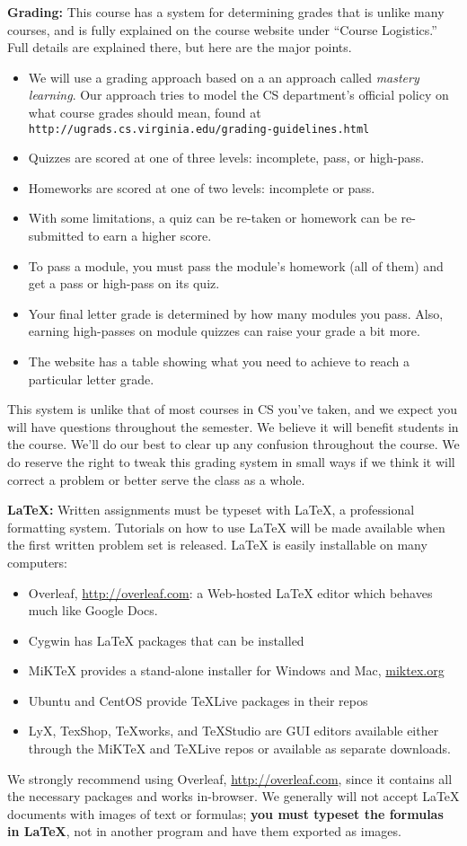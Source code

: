 \documentclass[12pt]{article}
\begin{document}
\textbf{Grading:} This course has a system for determining grades that is unlike many courses, and is fully explained on the course website under ``Course Logistics.'' Full details are explained there, but here are the major points.
\begin{itemize}
    \item We will use a grading approach based on a an approach called {\it mastery learning\/}. Our approach tries to model the CS department's official policy on what course grades should mean, found at {\tt http://ugrads.cs.virginia.edu/grading-guidelines.html}
    \item Quizzes are scored at one of three levels:  incomplete, pass, or high-pass.
    \item Homeworks are scored at one of two levels:  incomplete or pass.
    \item With some limitations, a quiz can be re-taken or homework can be re-submitted to earn a higher score.
    \item To pass a module, you must pass the module's homework (all of them) and get a pass or high-pass on its quiz.
    \item Your final letter grade is determined by how many modules you pass. Also, earning high-passes on module quizzes can raise your grade a bit more.
    \item The website has a table showing what you need to achieve to reach a particular letter grade.
\end{itemize}
This system is unlike that of most courses in CS you've taken, and we expect you will have questions throughout the semester. We believe it will benefit students in the course. We'll do our best to clear up any confusion throughout the course. We do reserve the right to tweak this grading system in small ways if we think it will correct a problem or better serve the class as a whole.


\textbf{\LaTeX:} Written assignments must be typeset with \LaTeX, a professional formatting system. Tutorials on how to use \LaTeX{} will be made available when the first written problem set is released. \LaTeX{} is easily installable on many computers: 
\begin{itemize}
    \item Overleaf, \url{http://overleaf.com}: a Web-hosted \LaTeX{} editor which behaves much like Google Docs.
    \item Cygwin has \LaTeX{} packages that can be installed
    \item MiKTeX provides a stand-alone installer for Windows and Mac, \url{miktex.org}
    \item Ubuntu and CentOS provide TeXLive packages in their repos
    \item LyX, TexShop, TeXworks, and TeXStudio are GUI editors available either through the MiKTeX and TeXLive repos or available as separate downloads.
\end{itemize}
We strongly recommend using Overleaf, \url{http://overleaf.com}, since it contains all the necessary packages and works in-browser. We generally will not accept \LaTeX{} documents with images of text or formulas; \textbf{you must typeset the formulas in \LaTeX}, not in another program and have them exported as images.
\end{document}
